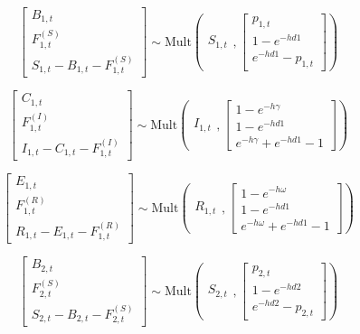 \documentclass[10pt]{article}
\begin{document}
\[
\left[ \begin{array}{c}
    B_{1,t} \\
    F^{(S)}_{1,t} \\
    S_{1,t} - B_{1,t} - F^{(S)}_{1,t}
\end{array} \right]
\sim \text{Mult} 
\left( \begin{array}{c}
    S_{1,t} 
\end{array}, \left[ \begin{array}{c}
    p_{1,t} \\
    1 - e^{-hd1} \\
    e^{-hd1} - p_{1,t}
\end{array} \right] \right)
\]

\[
\left[ \begin{array}{c}
    C_{1,t} \\
    F^{(I)}_{1,t} \\
    I_{1,t} - C_{1,t} - F^{(I)}_{1,t}
\end{array} \right]
\sim \text{Mult} 
\left( \begin{array}{c}
    I_{1,t}
\end{array}, \left[ \begin{array}{c}
    1 - e^{-h\gamma} \\
    1 - e^{-hd1} \\
    e^{-h\gamma} + e^{-hd1} - 1
\end{array} \right] \right)
\]

\[
\left[ \begin{array}{c}
    E_{1,t} \\
    F^{(R)}_{1,t} \\
    R_{1,t} - E_{1,t} - F^{(R)}_{1,t}
\end{array} \right]
\sim \text{Mult} 
\left( \begin{array}{c}
    R_{1,t}
\end{array}, \left[ \begin{array}{c}
    1 - e^{-h\omega} \\
    1 - e^{-hd1} \\
    e^{-h\omega} + e^{-hd1} - 1
\end{array} \right] \right)
\]


\[
\left[ \begin{array}{c}
    B_{2,t} \\
    F^{(S)}_{2,t} \\
    S_{2,t} - B_{2,t} - F^{(S)}_{2,t}
\end{array} \right]
\sim \text{Mult} 
\left( \begin{array}{c}
    S_{2,t} 
\end{array}, \left[ \begin{array}{c}
    p_{2,t} \\
    1 - e^{-hd2} \\
    e^{-hd2} - p_{2,t}
\end{array} \right] \right)
\]
\end{document}
